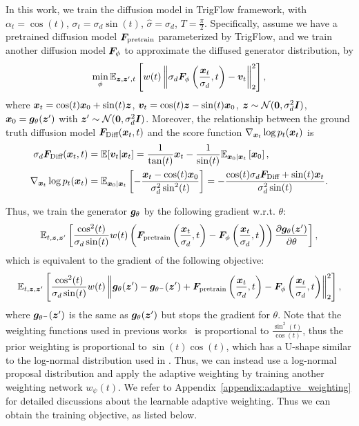 In this work, we train the diffusion model in TrigFlow framework, with $\alpha_t=\cos(t)$, $\sigma_t=\sigma_d\sin(t)$, $\hat\sigma=\sigma_d$, $T=\frac{\pi}{2}$. Specifically, assume we have a pretrained diffusion model ${\bm{F}}_{\text{pretrain}}$ parameterized by TrigFlow, and we train another diffusion model ${\bm{F}}_{\phi}$ to approximate the diffused generator distribution, by
\begin{equation*}
    \min_\phi \mathbb{E}_{{\bm{z}},{\bm{z}}',t}\left[
    w(t)\left\|
        \sigma_d {\bm{F}}_{\phi}\left(\frac{{\bm{x}}_t}{\sigma_d}, t\right) - {\bm{v}}_t    
    \right\|_2^2
    \right],
\end{equation*}
where ${\bm{x}}_t = \cos(t){\bm{x}}_0 + \sin(t){\bm{z}}$, ${\bm{v}}_t = \cos(t){\bm{z}} - \sin(t) {\bm{x}}_0$, ${\bm{z}} \sim {\mathcal{N}}({\bm{0}}, \sigma_d^2{\bm{I}})$, ${\bm{x}}_0 = {\bm{g}}_\theta({\bm{z}}')$ with ${\bm{z}}' \sim {\mathcal{N}}({\bm{0}}, \sigma_d^2{\bm{I}})$. Moreover, the relationship between the ground truth diffusion model ${\bm{F}}_{\text{Diff}}({\bm{x}}_t,t)$ and the score function $\nabla_{{\bm{x}}_t}\log p_t({\bm{x}}_t)$ is
\begin{equation*}
\begin{aligned}
    \sigma_d {\bm{F}}_{\text{Diff}}({\bm{x}}_t,t) &= \mathbb{E}[{\bm{v}}_t | {\bm{x}}_t] = \frac{1}{\tan(t)}{\bm{x}}_t - \frac{1}{\sin(t)}\mathbb{E}_{{\bm{x}}_0|{\bm{x}}_t}\left[
        {\bm{x}}_0 
    \right], \\
    \nabla_{{\bm{x}}_t} \log p_t({\bm{x}}_t)
    &= \mathbb{E}_{{\bm{x}}_0|{\bm{x}}_t}\left[
        -\frac{{\bm{x}}_t - \cos(t){\bm{x}}_0}{\sigma_d^2\sin^2(t)}     
    \right]
    = -\frac{\cos(t)\sigma_d{\bm{F}}_{\text{Diff}} + \sin(t){\bm{x}}_t}{\sigma_d^2 \sin(t)}.
\end{aligned}
\end{equation*}

Thus, we train the generator ${\bm{g}}_\theta$ by the following gradient w.r.t. $\theta$:
\begin{equation*}
    \mathbb{E}_{t,{\bm{z}},{\bm{z}}'}\left[\frac{\cos^2(t)}{\sigma_d\sin(t)} w(t)
        \left({\bm{F}}_{\text{pretrain}}\left(\frac{{\bm{x}}_t}{\sigma_d},t\right) - {\bm{F}}_\phi\left(\frac{{\bm{x}}_t}{\sigma_d},t\right)\right)\frac{\partial {\bm{g}}_\theta({\bm{z}}')}{\partial \theta}
    \right],
\end{equation*}
which is equivalent to the gradient of the following objective:
\begin{equation*}
    \mathbb{E}_{t,{\bm{z}},{\bm{z}}'}\left[\frac{\cos^2(t)}{\sigma_d\sin(t)} w(t)
    \left\|
         {\bm{g}}_\theta({\bm{z}}') - {\bm{g}}_{\theta^-}({\bm{z}}') + {\bm{F}}_{\text{pretrain}}\left(\frac{{\bm{x}}_t}{\sigma_d},t\right) - {\bm{F}}_\phi\left(\frac{{\bm{x}}_t}{\sigma_d},t\right)
    \right\|_2^2
    \right],
\end{equation*}
where ${\bm{g}}_{\theta^-}({\bm{z}}')$ is the same as ${\bm{g}}_\theta({\bm{z}}')$ but stops the gradient for $\theta$. Note that the weighting functions used in previous works~\citep{wang2024prolificdreamer,yin2024dmd} is proportional to $\frac{\sin^2(t)}{\cos(t)}$, thus the prior weighting is proportional to $\sin(t)\cos(t)$, which has a U-shape similar to the log-normal distribution used in \citet{karras2022edm}. Thus, we can instead use a log-normal proposal distribution and apply the adaptive weighting by training another weighting network $w_\psi(t)$. We refer to Appendix~\ref{appendix:adaptive_weighting} for detailed discussions about the learnable adaptive weighting. Thus we can obtain the training objective, as listed below.

